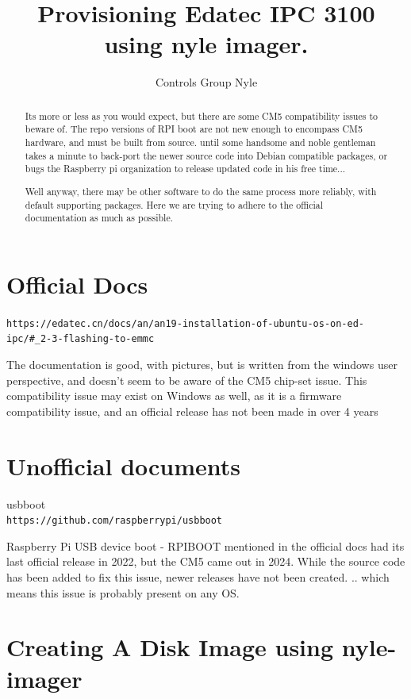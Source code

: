 \documentclass[]{article}
\title{Provisioning Edatec IPC 3100 using nyle imager.}
\author{Controls Group Nyle}
\begin{document}
	\sloppy
	
	\maketitle
	
	\begin{abstract}
		Its more or less as you would expect, but there are some CM5 compatibility issues to beware of.
		The repo versions of RPI boot are not new enough to encompass CM5 hardware, and must be built from
		source. until some handsome and noble gentleman takes a minute to back-port the newer source code into Debian compatible packages, or bugs the Raspberry pi organization to release updated code in his free time...
		
		Well anyway, there may be other software to do the same process more reliably, with default supporting packages. Here we are trying to adhere to the official documentation as much as possible.
	\end{abstract}
	
	\section*{Official Docs}
	\texttt{https://edatec.cn/docs/an/an19-installation-of-ubuntu-os-on-ed-ipc/\#\_2-3-flashing-to-emmc}
	
	The documentation is good, with pictures, but is written from the windows user perspective, and doesn't seem to be aware of the CM5 chip-set issue.
	This compatibility issue may exist on Windows as well, as it is a firmware compatibility issue, and an official release has not been made in over 4 years
	
	\section*{Unofficial documents}
	usbboot \\
	\texttt{https://github.com/raspberrypi/usbboot}
	
	Raspberry Pi USB device boot - RPIBOOT
	mentioned in the official docs had its last official release in 2022, but the CM5 came out in 2024.
	While the source code has been added to fix this issue, newer releases have not been created. .. which means this issue is probably present on any OS.
	

	
	\section*{Creating A Disk Image using nyle-imager}
\end{document}
